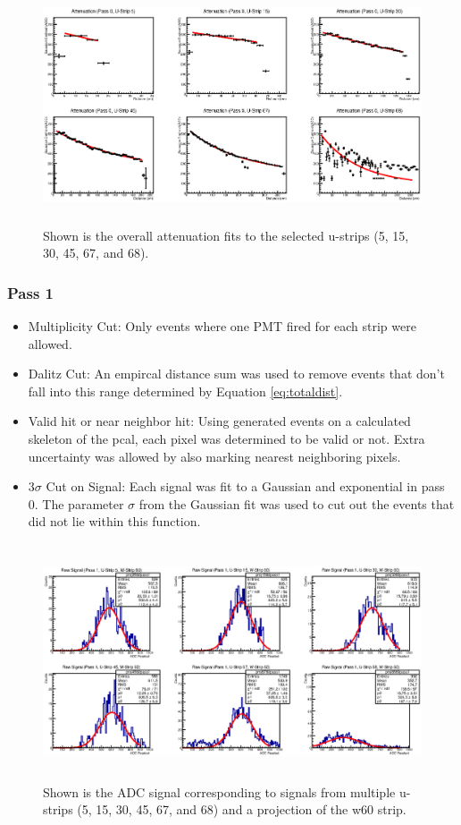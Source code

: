 \begin{figure}[h]
    \centering
    \includegraphics[height= 2.75in, keepaspectratio = true]{atpass0}
    \caption{Shown is the overall attenuation fits to the selected u-strips 
    (5, 15, 30, 45, 67, and 68).}
    \label{fig:atpass0}
\end{figure}


\clearpage
\FloatBarrier
\subsubsection{Pass 1}
\begin{itemize}
    \item Multiplicity Cut: Only events where one PMT fired for each strip were allowed.
    \item Dalitz Cut: An empircal distance sum was used to remove events that don't fall 
    into this range determined by Equation \ref{eq:totaldist}.
    \item Valid hit or near neighbor hit: Using generated events on a calculated skeleton
     of the pcal, each pixel was determined to be valid or not. Extra uncertainty was 
     allowed by also marking nearest neighboring pixels.
    \item 3$\sigma$ Cut on Signal: Each signal was fit to a Gaussian and exponential in 
    pass 0. The parameter $\sigma$ from the Gaussian fit was used to cut out the events
     that did not lie within this function.
\end{itemize}


\begin{figure}[h]
    \centering
    \includegraphics[height= 2.75in, keepaspectratio = true]{pass1}
    \caption{Shown is the ADC signal corresponding to signals from multiple u-strips
     (5, 15, 30, 45, 67, and 68) and a projection of the w60 strip.}
    \label{fig:pass1}
\end{figure}

